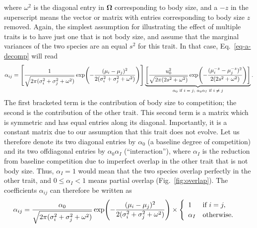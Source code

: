 \documentclass{article}
\newcommand{\mat}[1]{\bm{#1}}
\let\originalleft\left
\let\originalright\right
\renewcommand{\left}{\mathopen{}\mathclose\bgroup\originalleft}
\renewcommand{\right}{\aftergroup\egroup\originalright}
\begin{document}
where $\omega^2$ is the diagonal entry in $\mat{\Omega}$ corresponding to body size, and a $-z$ in the superscript means the vector or matrix with entries corresponding to body size $z$ removed. Again, the simplest assumption for illustrating the effect of multiple traits is to have just one that is not body size, and assume that the marginal variances of the two species are an equal $s^2$ for this trait. In that case, Eq.~\ref{eq-a-decomp} will read
\begin{equation}
  \label{eq-a-prod}
  \alpha_{ij}
  = \left[
  \frac{1}{\sqrt{2\pi(\sigma_i^2 + \sigma_j^2 + \omega^2)}}
  \exp \left( -\frac{(\mu_i - \mu_j)^2}
  {2(\sigma_i^2 + \sigma_j^2 + \omega^2)} \right)
  \right] \underbrace{\left[
  \frac{u_0^2}{\sqrt{2\pi(2s^2 + \omega^2)}}
  \exp \left( -\frac{(\mu_i^{-z} - \mu_j^{-z})^2}
  {2(2s^2 + \omega^2)} \right)
  \right]}_{\text{$\alpha_0$ if $i = j$; $\alpha_0 \alpha_I$ if $i \ne j$}} .
\end{equation}
The first bracketed term is the contribution of body size to competition; the second is the contribution of the other trait. This second term is a matrix which is symmetric and has equal entries along its diagonal. Importantly, it is a constant matrix due to our assumption that this trait does not evolve. Let us therefore denote its two diagonal entries by $\alpha_0$ (a baseline degree of competition) and its two offdiagonal entries by $\alpha_0 \alpha_I$ (``interaction''), where $\alpha_I$ is the reduction from baseline competition due to imperfect overlap in the other trait that is not body size. Thus, $\alpha_I = 1$ would mean that the two species overlap perfectly in the other trait, and $0 \le \alpha_I < 1$ means partial overlap (Fig.~\ref{fig:overlap}). The coefficients $\alpha_{ij}$ can therefore be written as
\begin{equation}
  \label{eq-alphaN}
  \alpha_{ij}
  = \frac{\alpha_0}
  {\sqrt{2\pi(\sigma_i^2 + \sigma_j^2 + \omega^2)}}
  \exp \left( -\frac{(\mu_i - \mu_j)^2}
  {2(\sigma_i^2 + \sigma_j^2 + \omega^2)} \right)
  \times
  \begin{cases}
    \begin{array}{ll}
      1 & \text{if~} i = j, \\
      \alpha_I & \text{otherwise} .
    \end{array}
  \end{cases}
\end{equation}
\end{document}
